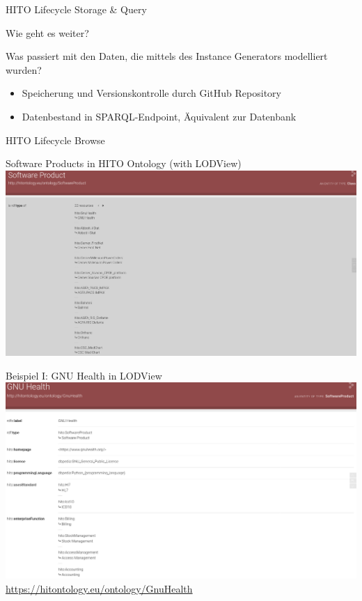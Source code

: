 \documentclass[aspectratio=1610,12pt]{beamer}
\begin{document}
\begin{frame}{HITO Lifecycle Storage \& Query}
 \centering
  \vspace{-0.5cm}
\end{frame}

\begin{frame}{Wie geht es weiter?}
  \begin{spacing}{1.5}
    Was passiert mit den Daten, die mittels des Instance Generators modelliert wurden?
  \begin{itemize}
    \item Speicherung und Versionskontrolle durch GitHub Repository
    \item Datenbestand in SPARQL-Endpoint, Äquivalent zur Datenbank
  \end{itemize}
\end{spacing}
\end{frame}

\begin{frame}{HITO Lifecycle Browse}
  \centering
  \vspace{-0.5cm}
\end{frame}

\begin{frame}{Software Products in HITO Ontology (with LODView)}
\centering
\includegraphics[width=\textwidth]{img/softwareproduct.png}
\end{frame}

\begin{frame}{Beispiel I: GNU Health in LODView}
\vspace{-0.3cm}
\centering
\includegraphics[width=.95\textwidth]{img/GnuHealth.png}
\footnotesize{\url{https://hitontology.eu/ontology/GnuHealth}}
\end{frame}
\end{document}
